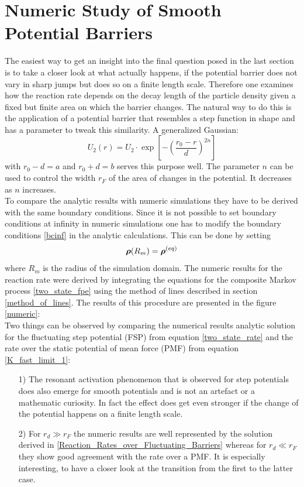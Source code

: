\section{Numeric Study of Smooth Potential Barriers}
\label{Numeric_Study}
The easiest way to get an insight into the final question posed in the last section is to take a closer look at what actually happens, if the potential barrier does not vary in sharp jumps but does so on a finite length scale.
Therefore one examines how the reaction rate depends on the decay length of the particle density given a fixed but finite area on which the barrier changes. The natural way to do this is the application of a potential barrier that resembles a step function in shape and has a parameter to tweak this similarity. A generalized Gaussian:
\begin{equation}
    U_2(r) = U_2 \cdot \exp \left[ - \left( \frac{r_0 - r}{d} \right)^{2n} \right]
    \label{generalized_gaussian}
\end{equation}
with $r_0-d=a$ and $r_0+d=b$ serves this purpose well. The parameter $n$ can be used to control the width $r_F$ of the area of changes in the potential. It decreases as $n$ increases. \\
To compare the analytic results with numeric simulations they have to be derived with the same boundary conditions. Since it is not possible to set boundary conditions at infinity in numeric simulations one has to modify the boundary conditions \eqref{bcinf} in the analytic calculations. This can be done by setting 
\begin{equation}
    \boldsymbol{\mathbf{\rho}}(R_m) = \boldsymbol{\mathbf{\rho}}^{(eq)}
    \label{BC_for_numerics}
\end{equation}
where $R_m$ is the radius of the simulation domain. The numeric results for the reaction rate were derived by integrating the equations for the composite Markov process \eqref{two_state_fpe} using the method of lines described in section \ref{method_of_lines}. The results of this procedure are presented in the figure \ref{numeric}: \vspace{-0.5 cm}\\

Two things can be observed by comparing the numerical results analytic solution for the fluctuating step potential (FSP) from equation \eqref{two_state_rate} and the rate over the static potential of mean force (PMF) from equation \eqref{K_fast_limit_1}: 
\begin{itemize}
    \item[1)]The resonant activation phenomenon that is observed for step potentials does also emerge for smooth potentials and is not an artefact or a mathematic curiosity. In fact the effect does get even stronger if the change of the potential happens on a finite length scale.
    \item[2)] For $r_d \gg r_F$ the numeric results are well represented by the solution derived in \ref{Reaction_Rates_over_Fluctuating_Barriers} whereas for $r_d \ll r_F$ they show good agreement with the rate over a PMF. It is especially interesting, to have a closer look at the transition from the first to the latter case.
\end{itemize}

